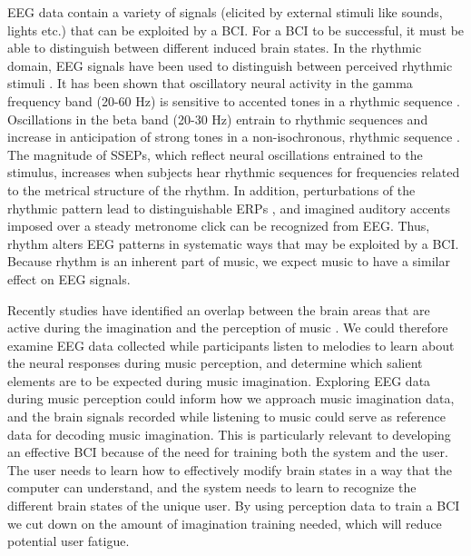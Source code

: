 EEG data contain a variety of signals (elicited by external stimuli like sounds, lights etc.) that can be exploited by a \ac{BCI}. 
For a \ac{BCI} to be successful, it must be able to distinguish between different induced brain states. 
In the rhythmic domain, \ac{EEG} signals have been used to distinguish between perceived rhythmic stimuli \cite{stober2014nips}.
It has been shown that oscillatory neural activity in the gamma frequency band (20-60 Hz) is sensitive to accented tones in a rhythmic sequence \cite{snyder_gamma-band_2005}.
Oscillations in the beta band (20-30 Hz) entrain to rhythmic sequences \cite{cirelli_beta_2014, merchant_beta_2015} and increase in anticipation of strong tones in a non-isochronous, rhythmic sequence \cite{iversen_top-down_2009,fujioka_beta_2009,fujioka_internalized_2012}.
The magnitude of \acp{SSEP}, which reflect neural oscillations entrained to the stimulus, increases when subjects hear rhythmic sequences for frequencies related to the metrical structure of the rhythm.
In addition, perturbations of the rhythmic pattern lead to distinguishable \acp{ERP} \cite{geiser_early_2009, vlek_shared_2011}, and imagined auditory accents imposed over a steady metronome click can be recognized from EEG.
Thus, rhythm alters \ac{EEG} patterns in systematic ways that may be exploited by a \ac{BCI}. 
Because rhythm is an inherent part of music, we expect music to have a similar effect on \ac{EEG} signals. 

Recently studies have identified an overlap between the brain areas that are active during the imagination and the perception of music \cite{halpern_fmri_2004,Kraemer2005,Herholz2008,herholz_2012}. 
We could therefore examine \ac{EEG} data collected while participants listen to melodies to learn about the neural responses during music perception, and determine which salient elements are to be expected during music imagination.
Exploring EEG data during music perception could inform how we approach music imagination data, and the brain signals recorded while listening to music could serve as reference data for decoding music imagination. 
This is particularly relevant to developing an effective \ac{BCI} because of the need for training both the system and the user.
The user needs to learn how to effectively modify brain states in a way that the computer can understand, and the system needs to learn to recognize the different brain states of the unique user.
By using perception data to train a \ac{BCI} we cut down on the amount of imagination training needed, which will reduce potential user fatigue.

